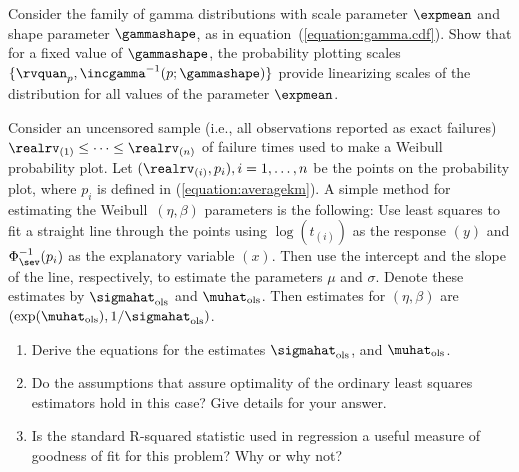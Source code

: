 \begin{exercise1}
Consider the family of gamma distributions with scale parameter
$\expmean$ and shape parameter $\gammashape$, as in
equation~(\ref{equation:gamma.cdf}). Show that for a fixed value
of $\gammashape$, the probability plotting scales $\{\rvquan_{p},
\incgamma^{-1}(p;\gammashape)\}$ provide linearizing scales of
the distribution for all values of the parameter $\expmean$.
\end{exercise1}


\begin{exercise1}
Consider an uncensored sample (i.e., all observations reported as
exact failures) $\realrv_{(1)} \le \cdots \le \realrv_{(n)}$ of
failure times used to make a Weibull probability plot. Let
$(\realrv_{(i)}, p_{i}), i=1, \ldots, n$ be the points on the
probability plot, where $p_{i}$ is defined in
(\ref{equation:averagekm}). A simple method for estimating the
Weibull~$(\eta, \beta)$ parameters is the following: Use least
squares to fit a straight line through the points using $\log
(t_{(i)})$ as the response $(y)$ and $\Phi^{-1}_{\sev}(p_i)$ as the explanatory variable
$(x)$.  Then use the intercept and the slope of the line,
respectively, to estimate the parameters $\mu$ and $\sigma$.  Denote
these estimates by $\sigmahat_{{\rm ols}}$ and $\muhat_{{\rm ols}}$.
Then estimates for $(\eta, \beta)$ are $(\exp(\muhat_{{\rm
ols}}),1/\sigmahat_{{\rm ols}})$.

\begin{enumerate} 	 
\item 
Derive the equations for the estimates $\sigmahat_{{\rm ols}}$, and
$\muhat_{{\rm ols}}$.
\item 
Do the assumptions that assure optimality of the ordinary least
squares estimators hold in this case?  Give details for your answer.
\item 
Is the standard R-squared statistic used in regression a useful measure
of goodness of fit for this problem? Why or why not?
\end{enumerate}
\end{exercise1}
